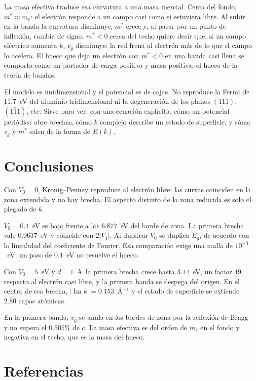 \documentclass[hidelinks]{article}
\begin{document}
La masa efectiva traduce esa curvatura a una masa inercial. Cerca del fondo, $m^*\approx m_e$: el electrón responde a un campo casi como si estuviera libre. Al subir en la banda la curvatura disminuye, $m^*$ crece y, al pasar por un punto de inflexión, cambia de signo. $m^*<0$ cerca del techo quiere decir que, si un campo eléctrico aumenta $k$, $v_g$ disminuye: la red frena al electrón más de lo que el campo lo acelera. El hueco que deja un electrón con $m^*<0$ en una banda casi llena se comporta como un portador de carga positiva y masa positiva, el hueco de la teoría de bandas.

El modelo es unidimensional y el potencial es de cajas. No reproduce la Fermi de $11.7$~eV del aluminio tridimensional ni la degeneración de los planos $(111)$, $(1\bar{1}1)$, etc. Sirve para ver, con una ecuación explícita, cómo un potencial periódico abre brechas, cómo $k$ complejo describe un estado de superficie, y cómo $v_g$ y $m^*$ salen de la forma de $E(k)$.

\section{Conclusiones}

Con $V_0=0$, Kronig--Penney reproduce al electrón libre: las curvas coinciden en la zona extendida y no hay brecha. El aspecto distinto de la zona reducida es solo el plegado de $k$.

$V_0=0.1$~eV es bajo frente a los $6.877$~eV del borde de zona. La primera brecha vale $0.0637$~eV y coincide con $2|V_1|$. Al duplicar $V_0$ se duplica $E_g$, de acuerdo con la linealidad del coeficiente de Fourier. Esa comparación exige una malla de $10^{-4}$~eV; un paso de $0.1$~eV no resuelve el hueco.

Con $V_0=5$~eV y $d=1$~\AA\ la primera brecha crece hasta $3.14$~eV, un factor $49$ respecto al electrón casi libre, y la primera banda se despega del origen. En el centro de esa brecha, $|\operatorname{Im}k|=0.153$~\AA$^{-1}$ y el estado de superficie se extiende $2.80$ capas atómicas.

En la primera banda, $v_g$ se anula en los bordes de zona por la reflexión de Bragg y no supera el $0.505\%$ de $c$. La masa efectiva es del orden de $m_e$ en el fondo y negativa en el techo, que es la masa del hueco.

\section{Referencias}
\end{document}
